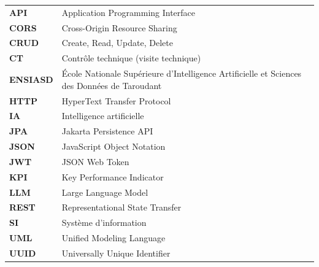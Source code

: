 \begin{flushleft}
\renewcommand{\arraystretch}{1.25}
\begin{tabular}{@{}p{}p{}@{}}
\textbf{API} & Application Programming Interface \\
\textbf{CORS} & Cross-Origin Resource Sharing \\
\textbf{CRUD} & Create, Read, Update, Delete \\
\textbf{CT} & Contrôle technique (visite technique) \\
\textbf{ENSIASD} & École Nationale Supérieure d'Intelligence Artificielle et Sciences des Données de Taroudant \\
\textbf{HTTP} & HyperText Transfer Protocol \\
\textbf{IA} & Intelligence artificielle \\
\textbf{JPA} & Jakarta Persistence API \\
\textbf{JSON} & JavaScript Object Notation \\
\textbf{JWT} & JSON Web Token \\
\textbf{KPI} & Key Performance Indicator \\
\textbf{LLM} & Large Language Model \\
\textbf{REST} & Representational State Transfer \\
\textbf{SI} & Système d'information \\
\textbf{UML} & Unified Modeling Language \\
\textbf{UUID} & Universally Unique Identifier \\
\end{tabular}
\end{flushleft}
